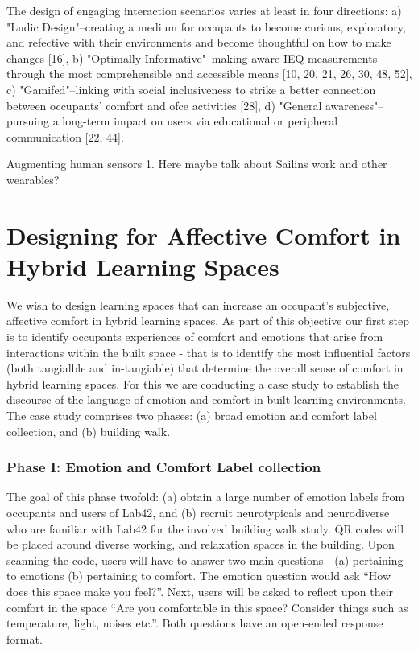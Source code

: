 \documentclass[acmconf, anonymous, review]{acmart}
\begin{document}
The design of engaging interaction scenarios varies at least in four directions: a) "Ludic Design"–creating a medium for occupants to become curious, exploratory, and refective with their environments and become thoughtful on how to
make changes [16], b) "Optimally Informative"–making aware IEQ
measurements through the most comprehensible and accessible
means [10, 20, 21, 26, 30, 48, 52], c) "Gamifed"–linking with social
inclusiveness to strike a better connection between occupants’ comfort and ofce activities [28], d) "General awareness"–pursuing a
long-term impact on users via educational or peripheral communication [22, 44].

Augmenting human sensors
1. Here maybe talk about Sailins work and other wearables?


\section{Designing for Affective Comfort in Hybrid Learning Spaces}


We wish to design learning spaces that can increase an occupant's subjective, affective comfort in hybrid learning spaces. As part of this objective our first step is to identify occupants experiences of comfort and emotions that arise from interactions within the built space - that is to identify the most influential factors (both tangialble and in-tangiable) that determine the overall sense of comfort in hybrid learning spaces. For this we are  conducting a case study to establish the discourse of the language of emotion and comfort in built learning environments. The case study comprises two phases: (a) broad emotion and comfort label collection, and (b) building walk. 

\subsubsection{Phase I: Emotion and Comfort Label collection}
The goal of this phase twofold: (a) obtain a large number of emotion labels from occupants and users of Lab42, and (b) recruit neurotypicals and neurodiverse who are familiar with Lab42 for the involved building walk study. QR codes will be placed around diverse working, and relaxation spaces in the building. Upon scanning the code, users will have to answer two main questions - (a) pertaining to emotions (b) pertaining to comfort. The emotion question would ask “How does this space make you feel?”. Next, users will be asked to reflect upon their comfort in the space “Are you comfortable in this space? Consider things such as temperature, light, noises etc.”. Both questions have an open-ended response format.
\end{document}
